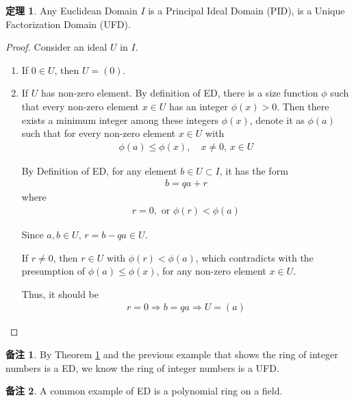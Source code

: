 \documentclass[utf8]{ctexbook}
\theoremstyle{definition}
\newtheorem{prototheorem}{定理}[section]
\newenvironment{theorem}
   {\colorlet{shadecolor}{pink!30}\begin{shaded}\begin{prototheorem}}
   {\end{prototheorem}\end{shaded}}
\newtheorem{memo}{备注}[section]
\begin{document}
\begin{theorem}
\label{theorem_ED_is_PID_is_UFD}
Any Euclidean Domain $I$ is a Principal Ideal Domain (PID), is a Unique Factorization Domain (UFD).
\end{theorem}

\begin{proof}
Consider an ideal $U$ in $I$.
\begin{enumerate}
\item{If $0 \in U$, then $U = (0)$.}
\item{If $U$ has non-zero element. By definition of ED, there is a size function $\phi$ such that every non-zero element $x \in U$ has an integer $\phi(x) > 0$. Then there exists a minimum integer among these integers $\phi(x)$, denote it as $\phi(a)$ such that for every non-zero element $x \in U$ with
\begin{align*}
\phi(a) \leq \phi(x), \quad x \neq 0, \, x \in U
\end{align*}

By Definition of ED, for any element $b \in U \subset I$, it has the form
\begin{align*}
b = q a + r 
\end{align*}
where 
\begin{align*}
r = 0, \mbox{ or } \phi(r) < \phi(a)
\end{align*}

Since $a, b \in U$, $r = b - q a \in U$.

If $r \neq 0$, then $r \in U$ with $\phi(r) < \phi(a)$, which contradicts with the presumption of $\phi(a) \leq \phi(x)$, for any non-zero element $x \in U$.

Thus, it should be
\begin{align*}
r = 0 \Longrightarrow b = q a \Longrightarrow U = (a)
\end{align*}

}
\end{enumerate}

\end{proof}

\begin{memo}
By Theorem \ref{theorem_ED_is_PID_is_UFD} and the previous example that shows the ring of integer numbers is a ED, we know the ring of integer numbers is a UFD.
\end{memo}

\begin{memo}
A common example of ED is a polynomial ring on a field.
\end{memo}
\end{document}
